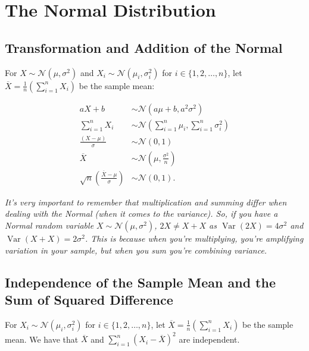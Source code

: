 \documentclass[a4paper, 12pt, twoside]{article}
\DeclareMathOperator{\Var}{Var}
\begin{document}
\newpage

\section{The Normal Distribution}

\subsection{Transformation and Addition of the Normal}

For $X \sim \mathcal{N}(\mu, \sigma^2)$ and $X_i \sim
    \mathcal{N}(\mu_i, \sigma_i^2)$ for $i \in \{1, 2, \ldots, n\}$,
let $\overline{X} = \frac{1}{n}(\sum_{i = 1}^n X_i)$ be the sample mean:

\begin{align*}
    aX + b                                                 & \sim \mathcal{N}(a\mu + b, a^2\sigma^2) \tag{Linear Transformation} \\
    \sum_{i = 1}^n X_i                                     & \sim
    \mathcal{N}(\sum_{i = 1}^n\mu_i, \sum_{i = 1}^n\sigma_i^2) \tag{Summed}                                                      \\
    \frac{(X - \mu)}{\sigma}                               & \sim \mathcal{N}(0, 1) \tag{Standardised}                           \\
    \overline{X}                                           & \sim \mathcal{N}(\mu, \frac{\sigma^2}{n}) \tag{Sample Mean}         \\
    \sqrt{n}\left(\frac{\overline{X} - \mu}{\sigma}\right) & \sim \mathcal{N}(0, 1). \tag{Standardised Sample Mean}
\end{align*}

\textit{It's very important to remember that multiplication and summing differ
    when dealing with the Normal (when it comes to the variance). So, if you have
    a Normal random variable $X \sim \mathcal{N}(\mu, \sigma^2)$, $2X \neq X + X$
    as $\Var(2X) = 4\sigma^2$ and $\Var(X + X) = 2\sigma^2$. This is because when
    you're multiplying, you're amplifying variation in your sample, but when you
    sum you're combining variance.}

\subsection{Independence of the Sample Mean and the Sum of Squared Difference}

For $X_i \sim \mathcal{N}(\mu_i, \sigma_i^2)$ for $i \in \{1, 2, \ldots, n\}$,
let $\overline{X} = \frac{1}{n}(\sum_{i = 1}^n X_i)$ be the sample mean.
We have that $\overline{X}$ and $\sum_{i = 1}^n(X_i - \overline{X})^2$
are independent.
\end{document}
